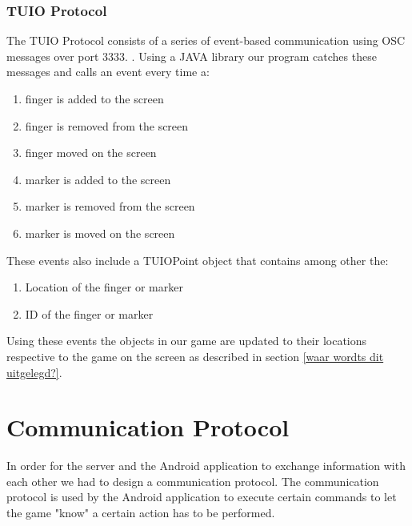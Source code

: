 \documentclass[a4paper,10pt]{article}
\begin{document}
		\subsubsection{TUIO Protocol}
		\label{sec:tuioprotocol}
		The TUIO Protocol consists of a series of event-based communication using OSC messages over port 3333. \cite{tuioProtocol}. 
		Using a JAVA library our program catches these messages and calls an event every time a:
		\begin{enumerate}
			\item finger is added to the screen
			\item finger is removed from the screen
			\item finger moved on the screen
			\item marker is added to the screen
			\item marker is removed from the screen
			\item marker is moved on the screen
		\end{enumerate}
		These events also include a TUIOPoint object that contains among other the:
		\begin{enumerate}
			\item Location of the finger or marker
			\item ID of the finger or marker
		\end{enumerate}
		Using these events the objects in our game are updated to their locations respective to the game on the screen as described in section \ref{waar wordts dit uitgelegd?}.
		
\section{Communication Protocol}
\label{sec:communication-protocol}
In order for the server and the Android application to exchange information with each other we had to design a communication protocol.
The communication protocol is used by the Android application to execute certain commands to let the game "know" a certain action has to be performed.
\end{document}
